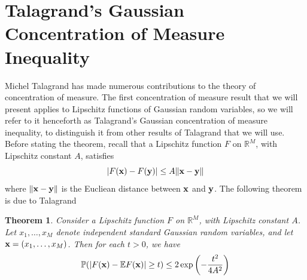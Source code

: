 \documentclass[12pt]{report}
\newtheorem{thm}{Theorem}[section]
\newcommand{\be}{\begin{equation}}
\newcommand{\ee}{\end{equation}}
\theoremstyle{definition}
\begin{document}
\section{Talagrand's Gaussian Concentration of Measure Inequality}
Michel Talagrand has made numerous contributions to the theory of concentration of measure.  The first concentration of measure result that we will present applies to Lipschitz functions of Gaussian random variables, so we will refer to it henceforth as Talagrand's Gaussian concentration of measure inequality, to distinguish it from other results of Talagrand that we will use.  Before stating the theorem, recall that a Lipschitz function $F$ on $\mathbb{R}^M$, with Lipschitz constant $A$, satisfies 
$$
|F({\bf x})-F({\bf y})|\leq A \|{\bf x}-{\bf y}\|
$$
where  $\|\bf{x}-\bf{y}\|$ is the Eucliean distance between $\bf{x}$ and $\bf{y}$. 
The following theorem is due to Talagrand \cite{Talagrandbook}
\begin{thm}
\label{GCOM}
Consider a Lipschitz function $F$ on $\mathbb{R}^M$, with Lipschitz constant $A$.  Let $x_1,\dots,x_M$ denote independent standard Gaussian random variables, and let ${\bf x}=(x_1,\dots,x_M)$.  Then for each $t>0$, we have 
\be
\mathbb{P}(|F({\bf x})-\mathbb{E}F({\bf x})|\geq t)\leq 2\exp\left(-\frac{t^2}{4A^2}\right)
\ee
\end{thm}
\end{document}
